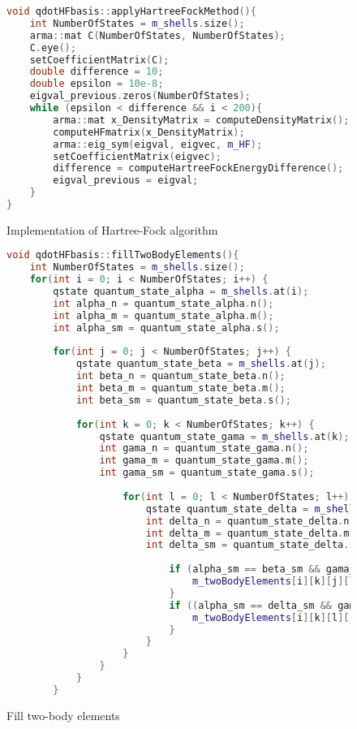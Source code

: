 \documentclass[twoside,english]{uiofysmaster}
\theoremstyle{definition}
\begin{document}
\begin{figure}
	\begin{lstlisting}[language=C++]
void qdotHFbasis::applyHartreeFockMethod(){
	int NumberOfStates = m_shells.size();
	arma::mat C(NumberOfStates, NumberOfStates);
	C.eye();
	setCoefficientMatrix(C);
	double difference = 10; 
	double epsilon = 10e-8;
	eigval_previous.zeros(NumberOfStates);
	while (epsilon < difference && i < 200){
		arma::mat x_DensityMatrix = computeDensityMatrix();
		computeHFmatrix(x_DensityMatrix);
		arma::eig_sym(eigval, eigvec, m_HF);
		setCoefficientMatrix(eigvec);
		difference = computeHartreeFockEnergyDifference();
		eigval_previous = eigval;
	}
}
\end{lstlisting}
\caption{Implementation of Hartree-Fock algorithm} \label{f:applyHF}
\end{figure}





\begin{figure}
\begin{lstlisting}[language=C++]
void qdotHFbasis::fillTwoBodyElements(){
	int NumberOfStates = m_shells.size();	
	for(int i = 0; i < NumberOfStates; i++) {
		qstate quantum_state_alpha = m_shells.at(i);
		int alpha_n = quantum_state_alpha.n();
		int alpha_m = quantum_state_alpha.m();
		int alpha_sm = quantum_state_alpha.s();
			
		for(int j = 0; j < NumberOfStates; j++) {
			qstate quantum_state_beta = m_shells.at(j);
			int beta_n = quantum_state_beta.n();
			int beta_m = quantum_state_beta.m();
			int beta_sm = quantum_state_beta.s();
			
			for(int k = 0; k < NumberOfStates; k++) {
				qstate quantum_state_gama = m_shells.at(k);
				int gama_n = quantum_state_gama.n();
				int gama_m = quantum_state_gama.m();
				int gama_sm = quantum_state_gama.s();
					
					for(int l = 0; l < NumberOfStates; l++) {
						qstate quantum_state_delta = m_shells.at(l);
						int delta_n = quantum_state_delta.n();
						int delta_m = quantum_state_delta.m();
						int delta_sm = quantum_state_delta.s();
							
							if (alpha_sm == beta_sm && gama_sm == delta_sm ){
								m_twoBodyElements[i][k][j][l] = Coulomb_HO(homega, alpha_n, alpha_m, gama_n, gama_m, beta_n, beta_m,  delta_n, delta_m);
							}
							if ((alpha_sm == delta_sm && gama_sm == beta_sm )){
								m_twoBodyElements[i][k][l][j] = Coulomb_HO(homega, alpha_n, alpha_m, gama_n, gama_m, delta_n, delta_m, beta_n, beta_m);
							}
						}
					}
				}
			}
		}
\end{lstlisting}
\caption{Fill two-body elements}
\end{figure}
\end{document}
